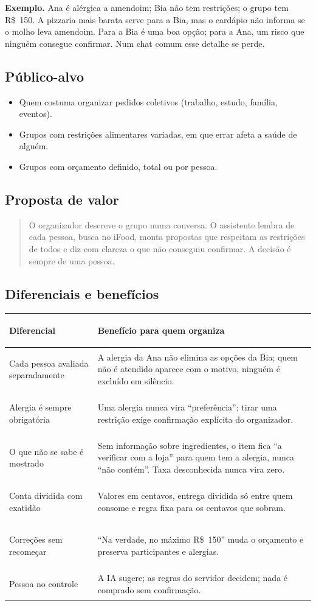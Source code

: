 \documentclass[11pt,a4paper]{article}
\begin{document}
\textbf{Exemplo.} Ana é alérgica a amendoim; Bia não tem restrições; o grupo tem R\$~150. A pizzaria mais barata serve para a Bia, mas o cardápio não informa se o molho leva amendoim. Para a Bia é uma boa opção; para a Ana, um risco que ninguém consegue confirmar. Num chat comum esse detalhe se perde.

\subsection{Público-alvo}
\begin{itemize}
  \item Quem costuma organizar pedidos coletivos (trabalho, estudo, família, eventos).
  \item Grupos com restrições alimentares variadas, em que errar afeta a saúde de alguém.
  \item Grupos com orçamento definido, total ou por pessoa.
\end{itemize}

\subsection{Proposta de valor}
\begin{quote}
O organizador descreve o grupo numa conversa. O assistente lembra de cada pessoa, busca no iFood, monta propostas que respeitam as restrições de todos e diz com clareza o que não conseguiu confirmar. A decisão é sempre de uma pessoa.
\end{quote}

\subsection{Diferenciais e benefícios}
\begin{center}
\begin{tabularx}{\linewidth}{>{\bfseries\raggedright\arraybackslash}p{4.2cm}Y}
\toprule
Diferencial & Benefício para quem organiza \\
\midrule
Cada pessoa avaliada separadamente & A alergia da Ana não elimina as opções da Bia; quem não é atendido aparece com o motivo, ninguém é excluído em silêncio. \\
Alergia é sempre obrigatória & Uma alergia nunca vira ``preferência''; tirar uma restrição exige confirmação explícita do organizador. \\
O que não se sabe é mostrado & Sem informação sobre ingredientes, o item fica ``a verificar com a loja'' para quem tem a alergia, nunca ``não contém''. Taxa desconhecida nunca vira zero. \\
Conta dividida com exatidão & Valores em centavos, entrega dividida só entre quem consome e regra fixa para os centavos que sobram. \\
Correções sem recomeçar & ``Na verdade, no máximo R\$~150'' muda o orçamento e preserva participantes e alergias. \\
Pessoa no controle & A IA sugere; as regras do servidor decidem; nada é comprado sem confirmação. \\
\bottomrule
\end{tabularx}
\end{center}
\end{document}
